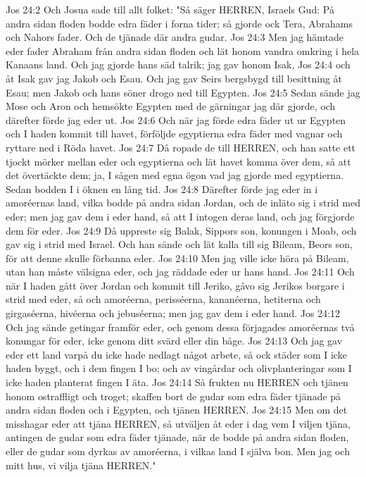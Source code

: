 Jos 24:2  Och Josua sade till allt folket: "Så säger HERREN, Israels Gud: På andra sidan floden bodde edra fäder i forna tider; så gjorde ock Tera, Abrahams och Nahors fader. Och de tjänade där andra gudar.
Jos 24:3  Men jag hämtade eder fader Abraham från andra sidan floden och lät honom vandra omkring i hela Kanaans land. Och jag gjorde hans säd talrik; jag gav honom Isak,
Jos 24:4  och åt Isak gav jag Jakob och Esau. Och jag gav Seirs bergsbygd till besittning åt Esau; men Jakob och hans söner drogo ned till Egypten.
Jos 24:5  Sedan sände jag Mose och Aron och hemsökte Egypten med de gärningar jag där gjorde, och därefter förde jag eder ut.
Jos 24:6  Och när jag förde edra fäder ut ur Egypten och I haden kommit till havet, förföljde egyptierna edra fäder med vagnar och ryttare ned i Röda havet.
Jos 24:7  Då ropade de till HERREN, och han satte ett tjockt mörker mellan eder och egyptierna och lät havet komma över dem, så att det övertäckte dem; ja, I sågen med egna ögon vad jag gjorde med egyptierna. Sedan bodden I i öknen en lång tid.
Jos 24:8  Därefter förde jag eder in i amoréernas land, vilka bodde på andra sidan Jordan, och de inläto sig i strid med eder; men jag gav dem i eder hand, så att I intogen deras land, och jag förgjorde dem för eder.
Jos 24:9  Då uppreste sig Balak, Sippors son, konungen i Moab, och gav sig i strid med Israel. Och han sände och lät kalla till sig Bileam, Beors son, för att denne skulle förbanna eder.
Jos 24:10  Men jag ville icke höra på Bileam, utan han måste välsigna eder, och jag räddade eder ur hans hand.
Jos 24:11  Och när I haden gått över Jordan och kommit till Jeriko, gåvo sig Jerikos borgare i strid med eder, så och amoréerna, perisséerna, kananéerna, hetiterna och girgaséerna, hivéerna och jebuséerna; men jag gav dem i eder hand.
Jos 24:12  Och jag sände getingar framför eder, och genom dessa förjagades amoréernas två konungar för eder, icke genom ditt svärd eller din båge.
Jos 24:13  Och jag gav eder ett land varpå du icke hade nedlagt något arbete, så ock städer som I icke haden byggt, och i dem fingen I bo; och av vingårdar och olivplanteringar som I icke haden planterat fingen I äta.
Jos 24:14  Så frukten nu HERREN och tjänen honom ostraffligt och troget; skaffen bort de gudar som edra fäder tjänade på andra sidan floden och i Egypten, och tjänen HERREN.
Jos 24:15  Men om det misshagar eder att tjäna HERREN, så utväljen åt eder i dag vem I viljen tjäna, antingen de gudar som edra fäder tjänade, när de bodde på andra sidan floden, eller de gudar som dyrkas av amoréerna, i vilkas land I själva bon. Men jag och mitt hus, vi vilja tjäna HERREN."
